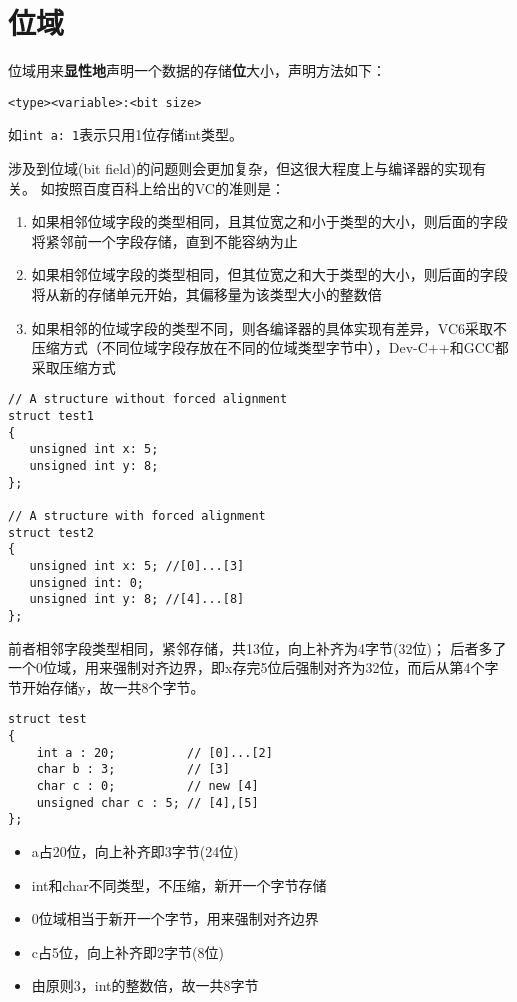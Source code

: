 \documentclass[compact]{note}
\begin{document}
\section{位域}
位域用来\textbf{显性地}声明一个数据的存储\textbf{位}大小，声明方法如下：
\begin{center}
\verb'<type><variable>:<bit size>'
\end{center}
如\verb'int a: 1'表示只用1位存储int类型。

涉及到位域(bit field)的问题则会更加复杂，但这很大程度上与编译器的实现有关。
如按照百度百科上给出的VC的准则是：
\begin{enumerate}
	\itemsep -3pt
	\item 如果相邻位域字段的类型相同，且其位宽之和小于类型的大小，则后面的字段将紧邻前一个字段存储，直到不能容纳为止
	\item 如果相邻位域字段的类型相同，但其位宽之和大于类型的大小，则后面的字段将从新的存储单元开始，其偏移量为该类型大小的整数倍
	\item 如果相邻的位域字段的类型不同，则各编译器的具体实现有差异，VC6采取不压缩方式（不同位域字段存放在不同的位域类型字节中），Dev-C++和GCC都采取压缩方式
\end{enumerate}
\begin{example}
\begin{lstlisting}
// A structure without forced alignment 
struct test1 
{ 
   unsigned int x: 5; 
   unsigned int y: 8; 
}; 
  
// A structure with forced alignment 
struct test2 
{ 
   unsigned int x: 5; //[0]...[3]
   unsigned int: 0; 
   unsigned int y: 8; //[4]...[8]
};
\end{lstlisting}
\end{example}
\begin{analysis}
前者相邻字段类型相同，紧邻存储，共13位，向上补齐为4字节(32位)；
后者多了一个0位域，用来强制对齐边界，即x存完5位后强制对齐为32位，而后从第4个字节开始存储y，故一共8个字节。
\end{analysis}

\begin{example}
\begin{lstlisting}
struct test
{
    int a : 20;          // [0]...[2]
    char b : 3;          // [3]
    char c : 0;          // new [4]
    unsigned char c : 5; // [4],[5]
};
\end{lstlisting}
\end{example}
\begin{analysis}
\begin{itemize}
	\itemsep -3pt
	\item a占20位，向上补齐即3字节(24位)
	\item int和char不同类型，不压缩，新开一个字节存储
	\item 0位域相当于新开一个字节，用来强制对齐边界
	\item c占5位，向上补齐即2字节(8位)
	\item 由原则3，int的整数倍，故一共8字节
\end{itemize}
\end{analysis}
\end{document}
